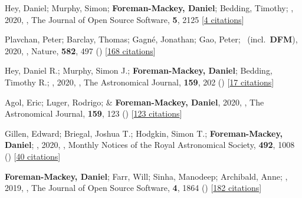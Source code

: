 \item[{\color{numcolor}\scriptsize56}] Hey, Daniel; Murphy, Simon; \textbf{Foreman-Mackey, Daniel}; Bedding, Timothy; \etal, 2020, , The Journal of Open Source Software, \textbf{5}, 2125 [\href{https://ui.adsabs.harvard.edu/abs/2020JOSS....5.2125H}{4 citations}]

\item[{\color{numcolor}\scriptsize55}] Plavchan, Peter; Barclay, Thomas; Gagn{\'e}, Jonathan; Gao, Peter; \etal\ (incl.\ \textbf{DFM}), 2020, , Nature, \textbf{582}, 497 () [\href{https://ui.adsabs.harvard.edu/abs/2020Natur.582..497P}{168 citations}]

\item[{\color{numcolor}\scriptsize54}] Hey, Daniel R.; Murphy, Simon J.; \textbf{Foreman-Mackey, Daniel}; Bedding, Timothy R.; \etal, 2020, , The Astronomical Journal, \textbf{159}, 202 () [\href{https://ui.adsabs.harvard.edu/abs/2020AJ....159..202H}{17 citations}]

\item[{\color{numcolor}\scriptsize53}] Agol, Eric; Luger, Rodrigo; \& \textbf{Foreman-Mackey, Daniel}, 2020, , The Astronomical Journal, \textbf{159}, 123 () [\href{https://ui.adsabs.harvard.edu/abs/2020AJ....159..123A}{123 citations}]

\item[{\color{numcolor}\scriptsize52}] Gillen, Edward; Briegal, Joshua T.; Hodgkin, Simon T.; \textbf{Foreman-Mackey, Daniel}; \etal, 2020, , Monthly Notices of the Royal Astronomical Society, \textbf{492}, 1008 () [\href{https://ui.adsabs.harvard.edu/abs/2020MNRAS.492.1008G}{40 citations}]

\item[{\color{numcolor}\scriptsize51}] \textbf{Foreman-Mackey, Daniel}; Farr, Will; Sinha, Manodeep; Archibald, Anne; \etal, 2019, , The Journal of Open Source Software, \textbf{4}, 1864 () [\href{https://ui.adsabs.harvard.edu/abs/2019JOSS....4.1864F}{182 citations}]

